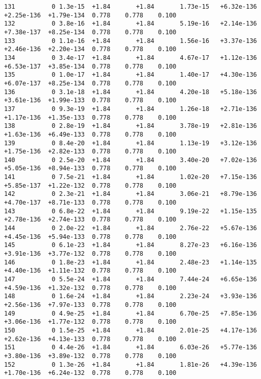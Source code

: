\documentclass[12pt]{article}
\numberwithin{equation}{section}
\begin{document}
\begin{lstlisting}
131          0 1.3e-15  +1.84       +1.84       1.73e-15   +6.32e-136  +2.25e-136  +1.79e-134  0.778    0.778    0.100
132          0 3.8e-16  +1.84       +1.84       5.19e-16   +2.14e-136  +7.38e-137  +8.25e-134  0.778    0.778    0.100
133          0 1.1e-16  +1.84       +1.84       1.56e-16   +3.37e-136  +2.46e-136  +2.20e-134  0.778    0.778    0.100
134          0 3.4e-17  +1.84       +1.84       4.67e-17   +1.12e-136  +6.53e-137  +3.85e-134  0.778    0.778    0.100
135          0 1.0e-17  +1.84       +1.84       1.40e-17   +4.30e-136  +6.07e-137  +8.25e-134  0.778    0.778    0.100
136          0 3.1e-18  +1.84       +1.84       4.20e-18   +5.18e-136  +3.61e-136  +1.99e-133  0.778    0.778    0.100
137          0 9.3e-19  +1.84       +1.84       1.26e-18   +2.71e-136  +1.17e-136  +1.35e-133  0.778    0.778    0.100
138          0 2.8e-19  +1.84       +1.84       3.78e-19   +2.81e-136  +1.63e-136  +6.49e-133  0.778    0.778    0.100
139          0 8.4e-20  +1.84       +1.84       1.13e-19   +3.12e-136  +1.75e-136  +2.82e-133  0.778    0.778    0.100
140          0 2.5e-20  +1.84       +1.84       3.40e-20   +7.02e-136  +5.05e-136  +8.94e-133  0.778    0.778    0.100
141          0 7.5e-21  +1.84       +1.84       1.02e-20   +7.15e-136  +5.85e-137  +1.22e-132  0.778    0.778    0.100
142          0 2.3e-21  +1.84       +1.84       3.06e-21   +8.79e-136  +4.70e-137  +8.71e-133  0.778    0.778    0.100
143          0 6.8e-22  +1.84       +1.84       9.19e-22   +1.15e-135  +2.78e-136  +2.74e-133  0.778    0.778    0.100
144          0 2.0e-22  +1.84       +1.84       2.76e-22   +5.67e-136  +4.45e-136  +5.94e-133  0.778    0.778    0.100
145          0 6.1e-23  +1.84       +1.84       8.27e-23   +6.16e-136  +3.91e-136  +3.77e-132  0.778    0.778    0.100
146          0 1.8e-23  +1.84       +1.84       2.48e-23   +1.14e-135  +4.40e-136  +1.11e-132  0.778    0.778    0.100
147          0 5.5e-24  +1.84       +1.84       7.44e-24   +6.65e-136  +4.59e-136  +1.32e-132  0.778    0.778    0.100
148          0 1.6e-24  +1.84       +1.84       2.23e-24   +3.93e-136  +2.56e-136  +7.97e-133  0.778    0.778    0.100
149          0 4.9e-25  +1.84       +1.84       6.70e-25   +7.85e-136  +3.06e-136  +1.77e-132  0.778    0.778    0.100
150          0 1.5e-25  +1.84       +1.84       2.01e-25   +4.17e-136  +2.62e-136  +4.13e-133  0.778    0.778    0.100
151          0 4.4e-26  +1.84       +1.84       6.03e-26   +5.77e-136  +3.80e-136  +3.89e-132  0.778    0.778    0.100
152          0 1.3e-26  +1.84       +1.84       1.81e-26   +4.39e-136  +1.70e-136  +6.24e-132  0.778    0.778    0.100

\end{lstlisting}
\end{document}
